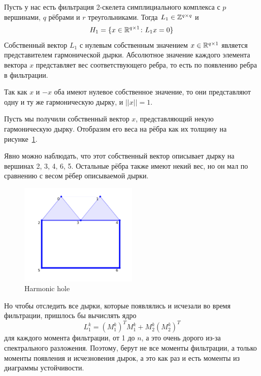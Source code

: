 \documentclass{article}
\begin{document}
Пусть у нас есть фильтрация 2-скелета симплициального комплекса с $p$ вершинами, $q$ рёбрами и $r$ треугольниками. Тогда $L_1\in \mathbb{Z}^{q\times q}$ и
\[H_1 = \{x\in \mathbb{R}^{q\times 1}\colon L_1 x = 0\}\]
Собственный вектор $L_1$ с нулевым собственным значением $x\in\mathbb{R}^{q\times 1}$ является представителем гармонической дырки. Абсолютное значение каждого элемента вектора $x$ представляет вес соответствующего ребра, то есть по появлению ребра в фильтрации.

Так как $x$ и $-x$ оба имеют нулевое собственное значение, то они представляют одну и ту же гармоническую дырку, и $||x|| = 1$.

\begin{example}
  Пусть мы получили собственный вектор $x$, представляющий некую гармоническую дырку. Отобразим его веса на рёбра как их толщину на рисунке~\ref{fig:harmonic_hole}.

  Явно можно наблюдать, что этот собственный вектор описывает дырку на вершинах 2, 3, 4, 6, 5. Остальные рёбра также имеют некий вес, но он мал по сравнению с весом рёбер описываемой дырки.

  \begin{figure}[ht]
    \centering
    \includegraphics[width=0.5\textwidth]{images/harmonic_hole.png}
    \caption{Harmonic hole}
    \label{fig:harmonic_hole}
  \end{figure}
\end{example}

Но чтобы отследить все дырки, которые появлялись и исчезали во время фильтрации, пришлось бы вычислять ядро
\[L_1^k = (M_{1}^k)^TM_1^k + M_{2}^k(M_{2}^k)^T\]
для каждого момента фильтрации, от 1 до $n$, а это очень дорого из-за спектрального разложения. Поэтому, берут не все моменты фильтрации, а только моменты появления и исчезновения дырок, а это как раз и есть моменты из диаграммы устойчивости.
\end{document}
